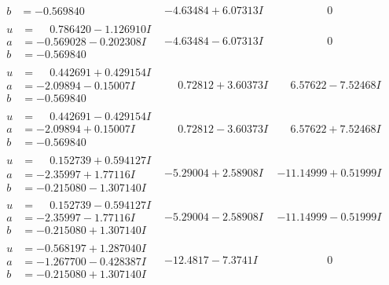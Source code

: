 \documentclass[1p]{elsarticle_modified}
\theoremstyle{definition}
\begin{document}
$$\begin{array}{c|c|c}
\begin{aligned}
b &= -0.569840\phantom{ +0.000000I}\end{aligned}
 & -4.63484 + 6.07313 I & \phantom{-0.000000 } 0 \\ \hline\begin{aligned}
u &= \phantom{-}0.786420 - 1.126910 I \\
a &= -0.569028 - 0.202308 I \\
b &= -0.569840\phantom{ +0.000000I}\end{aligned}
 & -4.63484 - 6.07313 I & \phantom{-0.000000 } 0 \\ \hline\begin{aligned}
u &= \phantom{-}0.442691 + 0.429154 I \\
a &= -2.09894 - 0.15007 I \\
b &= -0.569840\phantom{ +0.000000I}\end{aligned}
 & \phantom{-}0.72812 + 3.60373 I & \phantom{-}6.57622 - 7.52468 I \\ \hline\begin{aligned}
u &= \phantom{-}0.442691 - 0.429154 I \\
a &= -2.09894 + 0.15007 I \\
b &= -0.569840\phantom{ +0.000000I}\end{aligned}
 & \phantom{-}0.72812 - 3.60373 I & \phantom{-}6.57622 + 7.52468 I \\ \hline\begin{aligned}
u &= \phantom{-}0.152739 + 0.594127 I \\
a &= -2.35997 + 1.77116 I \\
b &= -0.215080 - 1.307140 I\end{aligned}
 & -5.29004 + 2.58908 I & -11.14999 + 0.51999 I \\ \hline\begin{aligned}
u &= \phantom{-}0.152739 - 0.594127 I \\
a &= -2.35997 - 1.77116 I \\
b &= -0.215080 + 1.307140 I\end{aligned}
 & -5.29004 - 2.58908 I & -11.14999 - 0.51999 I \\ \hline\begin{aligned}
u &= -0.568197 + 1.287040 I \\
a &= -1.267700 - 0.428387 I \\
b &= -0.215080 + 1.307140 I\end{aligned}
 & -12.4817 - 7.3741 I & \phantom{-0.000000 } 0 \\ \hline\begin{aligned}

\end{aligned}
\end{array}$$
\end{document}
